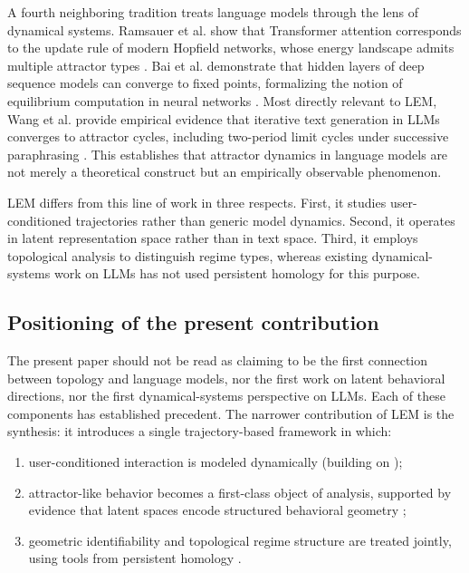 \documentclass[11pt]{article}
\begin{document}
A fourth neighboring tradition treats language models through the lens of dynamical
systems. Ramsauer et al. show that Transformer attention corresponds to the update
rule of modern Hopfield networks, whose energy landscape admits multiple attractor
types \cite{ramsauer2021hopfield}. Bai et al. demonstrate that hidden layers of deep
sequence models can converge to fixed points, formalizing the notion of equilibrium
computation in neural networks \cite{bai2019deq}. Most directly relevant to LEM, Wang
et al. provide empirical evidence that iterative text generation in LLMs converges to
attractor cycles, including two-period limit cycles under successive paraphrasing
\cite{wang2025attractorcycles}. This establishes that attractor dynamics in language
models are not merely a theoretical construct but an empirically observable
phenomenon.

LEM differs from this line of work in three respects. First, it studies
user-conditioned trajectories rather than generic model dynamics. Second, it operates
in latent representation space rather than in text space. Third, it employs
topological analysis to distinguish regime types, whereas existing dynamical-systems
work on LLMs has not used persistent homology for this purpose.

\subsection{Positioning of the present contribution}

The present paper should not be read as claiming to be the first connection between
topology and language models, nor the first work on latent behavioral directions, nor
the first dynamical-systems perspective on LLMs. Each of these components has
established precedent. The narrower contribution of LEM is the synthesis: it
introduces a single trajectory-based framework in which:

\begin{enumerate}[leftmargin=1.8em]
  \item user-conditioned interaction is modeled dynamically (building on
        \cite{wang2025attractorcycles,ramsauer2021hopfield,bai2019deq});
  \item attractor-like behavior becomes a first-class object of analysis, supported
        by evidence that latent spaces encode structured behavioral geometry
        \cite{chen2025persona,bricken2023monosemanticity};
  \item geometric identifiability and topological regime structure are treated
        jointly, using tools from persistent homology
        \cite{carlsson2009topology,gardinazzi2024persistent}.
\end{enumerate}
\end{document}
